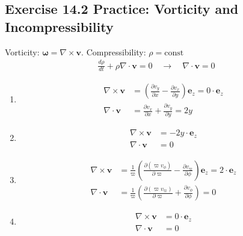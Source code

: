 \documentclass[../main.tex]{subfiles}
\begin{document}
\subsection{Exercise 14.2 Practice: Vorticity and Incompressibility}
Vorticity: $\boldsymbol\omega=\nabla\times\mathbf{v}$. Compressibility: $\rho=\text{const}$
\begin{align}
    \frac{d\rho}{dt}+\rho\nabla\cdot\mathbf{v}=0\quad\rightarrow\quad\nabla\cdot\mathbf{v}=0
\end{align}
\begin{enumerate}[label=(\alph*)]
    \item 
    \begin{align}
        \nabla\times\mathbf{v} &=\left(\frac{\partial v_y}{\partial x}-\frac{\partial v_x}{\partial y}\right)\mathbf{e}_z= 0\cdot\mathbf{e}_z\\
        \nabla\cdot\mathbf{v} &= \frac{\partial v_x}{\partial x}+\frac{\partial v_y}{\partial y}=2y
    \end{align}
    \item 
    \begin{align}
        \nabla\times\mathbf{v} &= -2y\cdot\mathbf{e}_z\\
        \nabla\cdot\mathbf{v} &= 0
    \end{align}
    \item 
    \begin{align}
        \nabla\times\mathbf{v} &= \frac{1}{\varpi}\left(\frac{\partial (\varpi v_\phi)}{\partial \varpi}-\frac{\partial v_\varpi}{\partial \phi}\right)\mathbf{e}_z= 2\cdot\mathbf{e}_z\\
        \nabla\cdot\mathbf{v} &= \frac{1}{\varpi}\left(\frac{\partial (\varpi v_\varpi)}{\partial \varpi}+\frac{\partial v_\phi}{\partial \phi}\right)=0
    \end{align}
    \item 
    \begin{align}
        \nabla\times\mathbf{v} &=  0\cdot\mathbf{e}_z\\
        \nabla\cdot\mathbf{v} &= 0
    \end{align}
\end{enumerate}
\end{document}
